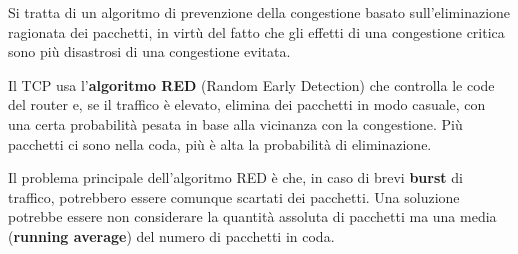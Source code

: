             Si tratta di un algoritmo di prevenzione della congestione basato sull'eliminazione ragionata dei pacchetti, in virtù del fatto che gli effetti di una congestione critica sono più disastrosi di una congestione evitata. 
            
            Il TCP usa l'\textbf{algoritmo RED} (Random Early Detection) che controlla le code del router e, se il traffico è elevato, elimina dei pacchetti in modo casuale, con una certa probabilità pesata in base alla vicinanza con la congestione. Più pacchetti ci sono nella coda, più è alta la probabilità di eliminazione.
            
            Il problema principale dell'algoritmo RED è che, in caso di brevi \textbf{burst} di traffico, potrebbero essere comunque scartati dei pacchetti. Una soluzione potrebbe essere non considerare la quantità assoluta di pacchetti ma una media (\textbf{running average}) del numero di pacchetti in coda.